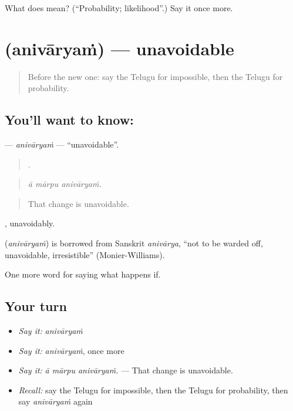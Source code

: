 \begin{tcolorbox}[breakable,colback=teal!4,colframe=teal!35!black,title={Before you move on}]
What does  mean? (\textquotedblleft{}Probability; likelihood\textquotedblright{}.) Say it once more.
\end{tcolorbox}
\section[\texorpdfstring{\te{అనివార్యం} (anivāryaṁ)}{అనివార్యం (anivāryaṁ)}]{ (anivāryaṁ) — unavoidable}

\label{lesson:TE-C418-anivaryam}



\begin{quote}
Before the new one: say the Telugu for impossible, then the Telugu for probability.
\end{quote}

\subsection*{You'll want to know: }
\textbf{} — \emph{anivāryaṁ} — \textquotedblleft{}unavoidable\textquotedblright{}.

\begin{quote}
  .
\end{quote}

\begin{quote}
\emph{ā mārpu anivāryaṁ.}
\end{quote}

\begin{quote}
That change is unavoidable.
\end{quote}

, unavoidably.

\begin{cousinweb}
\textbf{} (\emph{anivāryaṁ}) is borrowed from Sanskrit \emph{anivārya}, \textquotedblleft{}not to be warded off, unavoidable, irresistible\textquotedblright{} (Monier-Williams).
\end{cousinweb}

\begin{grammarlens}[title={What you've built}]
One more word for saying what happens if.
\end{grammarlens}

\subsection*{Your turn}
\begin{itemize}
\raggedright
  \item \emph{Say it:} \emph{anivāryaṁ}
  \item \emph{Say it:} \emph{anivāryaṁ}, once more
  \item \emph{Say it:} \emph{ā mārpu anivāryaṁ.} — That change is unavoidable.
  \item \emph{Recall:} say the Telugu for impossible, then the Telugu for probability, then say \emph{anivāryaṁ} again
\end{itemize}

